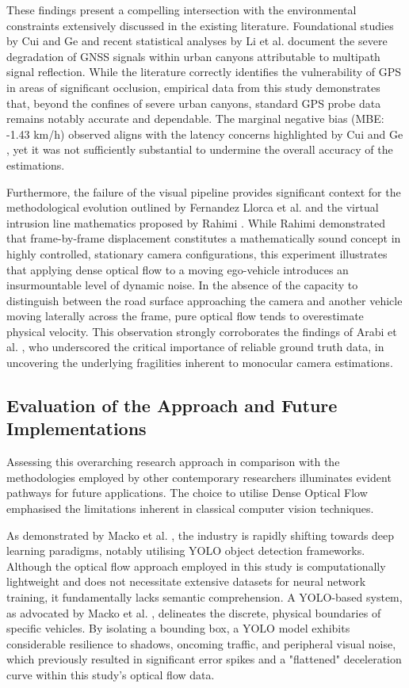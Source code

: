 These findings present a compelling intersection with the environmental constraints extensively discussed in the existing literature. Foundational studies by Cui and Ge \cite{cui2003autonomous} and recent statistical analyses by Li et al. \cite{li2025statistical} document the severe degradation of GNSS signals within urban canyons attributable to multipath signal reflection. While the literature correctly identifies the vulnerability of GPS in areas of significant occlusion, empirical data from this study demonstrates that, beyond the confines of severe urban canyons, standard GPS probe data remains notably accurate and dependable. The marginal negative bias (MBE: -1.43 km/h) observed aligns with the latency concerns highlighted by Cui and Ge \cite{cui2003autonomous}, yet it was not sufficiently substantial to undermine the overall accuracy of the estimations.

Furthermore, the failure of the visual pipeline provides significant context for the methodological evolution outlined by Fernandez Llorca et al. \cite{fernandez2021vision} and the virtual intrusion line mathematics proposed by Rahimi \cite{rahimi2018vehicle}. While Rahimi \cite{rahimi2018vehicle} demonstrated that frame-by-frame displacement constitutes a mathematically sound concept in highly controlled, stationary camera configurations, this experiment illustrates that applying dense optical flow to a moving ego-vehicle introduces an insurmountable level of dynamic noise. In the absence of the capacity to distinguish between the road surface approaching the camera and another vehicle moving laterally across the frame, pure optical flow tends to overestimate physical velocity. This observation strongly corroborates the findings of Arabi et al. \cite{arabi2022comparison}, who underscored the critical importance of reliable ground truth data, in uncovering the underlying fragilities inherent to monocular camera estimations.

\subsection{Evaluation of the Approach and Future Implementations}
Assessing this overarching research approach in comparison with the methodologies employed by other contemporary researchers illuminates evident pathways for future applications. The choice to utilise Dense Optical Flow emphasised the limitations inherent in classical computer vision techniques.

As demonstrated by Macko et al. \cite{macko2025efficient}, the industry is rapidly shifting towards deep learning paradigms, notably utilising YOLO object detection frameworks. Although the optical flow approach employed in this study is computationally lightweight and does not necessitate extensive datasets for neural network training, it fundamentally lacks semantic comprehension. A YOLO-based system, as advocated by Macko et al. \cite{macko2025efficient}, delineates the discrete, physical boundaries of specific vehicles. By isolating a bounding box, a YOLO model exhibits considerable resilience to shadows, oncoming traffic, and peripheral visual noise, which previously resulted in significant error spikes and a "flattened" deceleration curve within this study's optical flow data.

